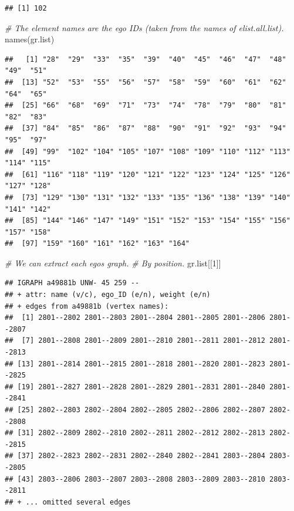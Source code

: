 \documentclass[
]{book}
\newenvironment{Shaded}{\begin{snugshade}}{\end{snugshade}}
\newcommand{\CommentTok}[1]{\textcolor[rgb]{0.56,0.35,0.01}{\textit{#1}}}
\newcommand{\DecValTok}[1]{\textcolor[rgb]{0.00,0.00,0.81}{#1}}
\newcommand{\FunctionTok}[1]{\textcolor[rgb]{0.00,0.00,0.00}{#1}}
\newcommand{\NormalTok}[1]{#1}
\begin{document}
\begin{verbatim}
## [1] 102
\end{verbatim}

\begin{Shaded}
\begin{Highlighting}[]
\CommentTok{\# The element names are the ego IDs (taken from the names of elist.all.list).}
\FunctionTok{names}\NormalTok{(gr.list)}
\end{Highlighting}
\end{Shaded}

\begin{verbatim}
##   [1] "28"  "29"  "33"  "35"  "39"  "40"  "45"  "46"  "47"  "48"  "49"  "51" 
##  [13] "52"  "53"  "55"  "56"  "57"  "58"  "59"  "60"  "61"  "62"  "64"  "65" 
##  [25] "66"  "68"  "69"  "71"  "73"  "74"  "78"  "79"  "80"  "81"  "82"  "83" 
##  [37] "84"  "85"  "86"  "87"  "88"  "90"  "91"  "92"  "93"  "94"  "95"  "97" 
##  [49] "99"  "102" "104" "105" "107" "108" "109" "110" "112" "113" "114" "115"
##  [61] "116" "118" "119" "120" "121" "122" "123" "124" "125" "126" "127" "128"
##  [73] "129" "130" "131" "132" "133" "135" "136" "138" "139" "140" "141" "142"
##  [85] "144" "146" "147" "149" "151" "152" "153" "154" "155" "156" "157" "158"
##  [97] "159" "160" "161" "162" "163" "164"
\end{verbatim}

\begin{Shaded}
\begin{Highlighting}[]
\CommentTok{\# We can extract each ego\textquotesingle{}s graph.}
\CommentTok{\# By position.}
\NormalTok{gr.list[[}\DecValTok{1}\NormalTok{]]}
\end{Highlighting}
\end{Shaded}

\begin{verbatim}
## IGRAPH a49881b UNW- 45 259 -- 
## + attr: name (v/c), ego_ID (e/n), weight (e/n)
## + edges from a49881b (vertex names):
##  [1] 2801--2802 2801--2803 2801--2804 2801--2805 2801--2806 2801--2807
##  [7] 2801--2808 2801--2809 2801--2810 2801--2811 2801--2812 2801--2813
## [13] 2801--2814 2801--2815 2801--2818 2801--2820 2801--2823 2801--2825
## [19] 2801--2827 2801--2828 2801--2829 2801--2831 2801--2840 2801--2841
## [25] 2802--2803 2802--2804 2802--2805 2802--2806 2802--2807 2802--2808
## [31] 2802--2809 2802--2810 2802--2811 2802--2812 2802--2813 2802--2815
## [37] 2802--2823 2802--2831 2802--2840 2802--2841 2803--2804 2803--2805
## [43] 2803--2806 2803--2807 2803--2808 2803--2809 2803--2810 2803--2811
## + ... omitted several edges
\end{verbatim}
\end{document}
